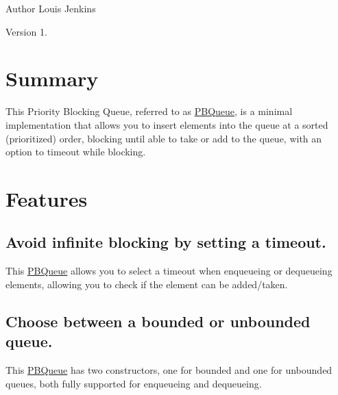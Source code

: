 \begin{DoxyAuthor}{Author}
Louis Jenkins 
\end{DoxyAuthor}
\begin{DoxyVersion}{Version}
1.
\end{DoxyVersion}
\hypertarget{index_list_summary}{}\section{Summary}\label{index_list_summary}
This Priority Blocking Queue, referred to as \hyperlink{struct_p_b_queue}{P\+B\+Queue}, is a minimal implementation that allows you to insert elements into the queue at a sorted (prioritized) order, blocking until able to take or add to the queue, with an option to timeout while blocking.\hypertarget{index_list_features}{}\section{Features}\label{index_list_features}
\hypertarget{index_timeout}{}\subsection{Avoid infinite blocking by setting a timeout.}\label{index_timeout}
This \hyperlink{struct_p_b_queue}{P\+B\+Queue} allows you to select a timeout when enqueueing or dequeueing elements, allowing you to check if the element can be added/taken.\hypertarget{index_options}{}\subsection{Choose between a bounded or unbounded queue.}\label{index_options}
This \hyperlink{struct_p_b_queue}{P\+B\+Queue} has two constructors, one for bounded and one for unbounded queues, both fully supported for enqueueing and dequeueing. 